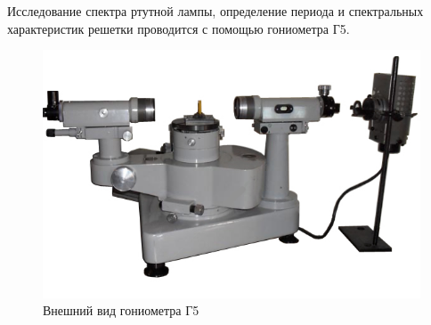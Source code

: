 \documentclass{letask}
\begin{document}
Исследование спектра ртутной лампы, определение периода и спектральных характеристик решетки проводится с помощью гониометра Г5.

\begin{figure}[H]
\centering
	\includegraphics[width = 0.7\lw]{g5}
	\caption{Внешний вид гониометра Г5}
	\label{fig:g5}
\end{figure}
\end{document}
